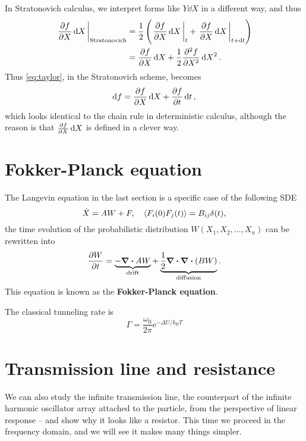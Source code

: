 \documentclass[hyperref, a4paper]{article}
\newcommand*{\ee}{\mathrm{e}}
\newcommand*{\concept}[1]{{\textbf{#1}}}
\newcommand*{\kB}{k_{\text{B}}}
\begin{document}
In Stratonovich calculus, we interpret forms like $Y \dd{X}$ in a different way,
and thus 
\begin{equation}
    \begin{aligned}
        \eval{\pdv{f}{X} \dd{X}}_{\text{Stratonovich}} &= 
        \frac{1}{2} \left(
            \eval{\pdv{f}{X} \dd{X}}_{t} + 
            \eval{\pdv{f}{X} \dd{X}}_{t + \dd{t}}
        \right) \\
        &= \pdv{f}{X} \dd{X} + \frac{1}{2} \pdv[2]{f}{X} \dd{X}^2.
    \end{aligned}
\end{equation}
Thus \eqref{eq:taylor}, in the Stratonovich scheme, becomes
\begin{equation}
    \dd{f} = \pdv{f}{X} \dd{X} + \pdv{f}{t} \dd{t},
\end{equation}
which looks identical to the chain rule in deterministic calculus,
although the reason is that $\pdv{f}{X} \dd{X}$ is defined in a clever way.

\section{Fokker-Planck equation}

The Langevin equation in the last section is a specific case of the following SDE 
\begin{equation}
    \dot{X} = A W + F, \quad 
    \expval{F_i(0) F_j(t)} = B_{ij} \delta(t),
\end{equation}
the time evolution of the probabilistic distribution $W(X_1, X_2, \ldots, X_n)$ 
can be rewritten into  
\begin{equation}
    \pdv{W}{t} = \underbrace{
        - \div{A W}
    }_{\text{drift}} + 
    \underbrace{
        \frac{1}{2} \div \div (B W)
    }_{\text{diffusion}} . 
\end{equation}
This equation is known as the \concept{Fokker-Planck equation}.

The classical tunneling rate is 
\begin{equation}
    \Gamma = \frac{\omega_0}{2\pi} \ee^{- \Delta U / \kB T}
\end{equation}

\section{Transmission line and resistance}

We can also study the infinite transmission line,
the counterpart of the infinite harmonic oscillator array 
attached to the particle,
from the perspective of linear response -- 
and show why it looks like a resistor.
This time we proceed in the frequency domain,
and we will see it makes many things simpler. 
\end{document}
